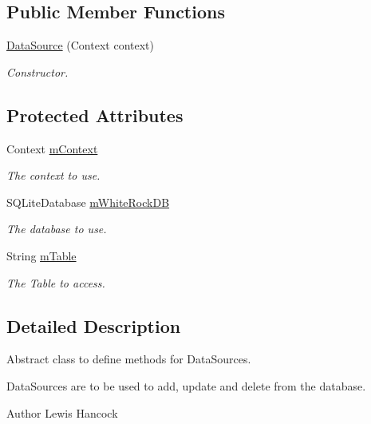 \subsection*{Public Member Functions}
\begin{DoxyCompactItemize}
\item 
\hyperlink{classuk_1_1ac_1_1swan_1_1digitaltrails_1_1database_1_1_data_source_aafb301a6dac3a3c63068a9798ceebff2}{Data\+Source} (Context context)
\begin{DoxyCompactList}\small\item\em Constructor. \end{DoxyCompactList}\end{DoxyCompactItemize}
\subsection*{Protected Attributes}
\begin{DoxyCompactItemize}
\item 
Context \hyperlink{classuk_1_1ac_1_1swan_1_1digitaltrails_1_1database_1_1_data_source_a1daf2406165149f28205c4ac895ee858}{m\+Context}
\begin{DoxyCompactList}\small\item\em The context to use. \end{DoxyCompactList}\item 
S\+Q\+Lite\+Database \hyperlink{classuk_1_1ac_1_1swan_1_1digitaltrails_1_1database_1_1_data_source_aafb91ad4da9b6ea6520f1268f9a6771d}{m\+White\+Rock\+D\+B}
\begin{DoxyCompactList}\small\item\em The database to use. \end{DoxyCompactList}\item 
String \hyperlink{classuk_1_1ac_1_1swan_1_1digitaltrails_1_1database_1_1_data_source_a5a038e9db6a268c1f8f70d74f0981e93}{m\+Table}
\begin{DoxyCompactList}\small\item\em The Table to access. \end{DoxyCompactList}\end{DoxyCompactItemize}


\subsection{Detailed Description}
Abstract class to define methods for Data\+Sources. 

Data\+Sources are to be used to add, update and delete from the database. \begin{DoxyAuthor}{Author}
Lewis Hancock 
\end{DoxyAuthor}


